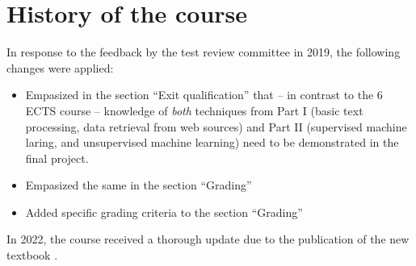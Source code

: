 \documentclass[a4paper,12pt]{report}
\begin{document}
\chapter{History of the course}
In response to the feedback by the test review committee in 2019, the following changes were applied:
\begin{itemize}
\item Empasized in the section ``Exit qualification'' that -- in contrast to the 6 ECTS course -- knowledge of \emph{both} techniques from Part I (basic text processing, data retrieval from web sources) and Part II (supervised machine laring, and unsupervised machine learning) need to be demonstrated in the final project.
\item Empasized the same in the section ``Grading''
\item Added specific grading criteria to the section ``Grading''
\end{itemize}

In 2022, the course received a thorough update due to the publication of the new textbook \citep{cssbook}.




 
 
 
\end{document}
